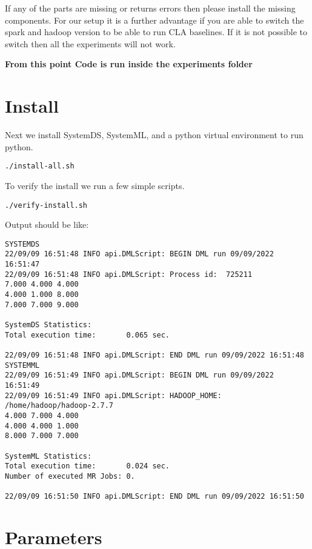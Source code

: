 \documentclass{readme}
\begin{document}
If any of the parts are missing or returns errors then please install the missing components.
For our setup it is a further advantage if you are able to switch the spark and hadoop version to
be able to run CLA baselines. If it is not possible to switch then all the experiments will not work.

\vspace{1cm}
\noindent
\textbf{From this point Code is run inside the experiments folder}
\vspace{1cm}

\newpage
\section{Install}

Next we install SystemDS, SystemML, and a python virtual environment to run python.

\begin{lstlisting}
./install-all.sh
\end{lstlisting}

To verify the install we run a few simple scripts.

\begin{lstlisting}
./verify-install.sh 
\end{lstlisting}

Output should be like:

\begin{lstlisting}
SYSTEMDS
22/09/09 16:51:48 INFO api.DMLScript: BEGIN DML run 09/09/2022 16:51:47
22/09/09 16:51:48 INFO api.DMLScript: Process id:  725211
7.000 4.000 4.000
4.000 1.000 8.000
7.000 7.000 9.000

SystemDS Statistics:
Total execution time:		0.065 sec.

22/09/09 16:51:48 INFO api.DMLScript: END DML run 09/09/2022 16:51:48
SYSTEMML
22/09/09 16:51:49 INFO api.DMLScript: BEGIN DML run 09/09/2022 16:51:49
22/09/09 16:51:49 INFO api.DMLScript: HADOOP_HOME: /home/hadoop/hadoop-2.7.7
4.000 7.000 4.000
4.000 4.000 1.000
8.000 7.000 7.000

SystemML Statistics:
Total execution time:		0.024 sec.
Number of executed MR Jobs:	0.

22/09/09 16:51:50 INFO api.DMLScript: END DML run 09/09/2022 16:51:50    
\end{lstlisting}

\newpage

\section{Parameters}
\end{document}
